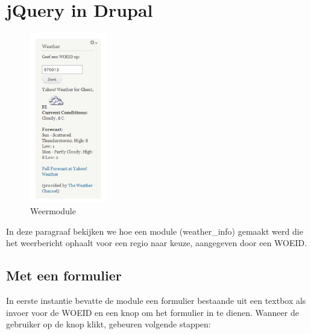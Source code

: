 \newpage

\section{jQuery in Drupal}

\begin{figure}
\vspace{-40pt}
\hspace{-10pt}
\centering
\includegraphics[width=0.3\textwidth]{fig/weermodule}
\vspace{-30pt}
\hspace{-10pt}
\centering
\caption{Weermodule}
\label{fig:weermodule}
\vspace{-70pt}
\end{figure}

In deze paragraaf bekijken we hoe een module (weather\_info) gemaakt werd die het weerbericht ophaalt voor een regio naar keuze, aangegeven door een WOEID.

\subsection{Met een formulier}

In eerste instantie bevatte de module een formulier bestaande uit een textbox als invoer voor de WOEID en een knop om het formulier in te dienen.
Wanneer de gebruiker op de knop klikt, gebeuren volgende stappen:

